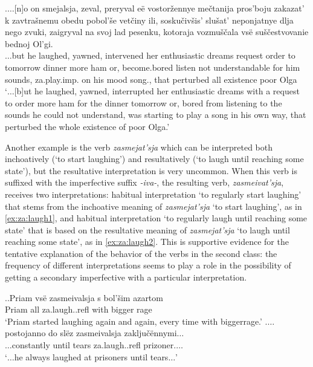\exg.\label{ex:zaigryvat}$\ldots$[n]o on smejalsja, zeval, preryval e\"{e} vostor\v{z}ennye me\v{c}tanija pros'boju zakazat' k zavtra\v{s}nemu obedu pobol'\v{s}e vet\v{c}iny ili, sosku\v{c}iv\v{s}is' slu\v{s}at' neponjatnye dlja nego zvuki, zaigryval na svoj lad pesenku, kotoraja vozmu\v{s}\v{c}ala vs\"{e} su\v{s}\v{c}estvovanie bednoj Ol'gi.\\
$\ldots$but he laughed, yawned, intervened her enthusiastic dreams request order to tomorrow dinner more ham or, {become.bored} listen {not understandable} for him sounds, za.play.imp. on his mood song., that perturbed all existence poor Olga\\
\trans `$\ldots$[b]ut he laughed, yawned, interrupted her enthusiastic dreams with a request to order more ham for the dinner tomorrow or, bored from listening to the sounds he could not understand, was starting to play a song in his own way, that perturbed the whole existence of poor Olga.'\\

Another example is the verb \textit{zasmejat'sja} which can be interpreted both inchoatively (`to start laughing') and resultatively (`to laugh until reaching some state'), but the resultative interpretation is very uncommon. When this verb is suffixed with the imperfective suffix \textit{-iva-}, the resulting verb, \textit{zasmeivat'sja}, receives two interpretations: habitual interpretation `to regularly start laughing' that stems from the inchoative meaning of \textit{zasmejat'sja} `to start laughing', as in \ref{ex:za:laugh1}, and habitual interpretation `to regularly laugh until reaching some state' that is based on the resultative meaning of \textit{zasmejat'sja} `to laugh until reaching some state', as in \ref{ex:za:laugh2}. This is supportive evidence for the tentative explanation of the behavior of the verbs in the second class: the frequency of different interpretations seems to play a role in the possibility of getting a secondary imperfective with a particular interpretation.

\ex.\label{ex:za:laugh}\ag.\label{ex:za:laugh1}Priam vs\"{e} zasmeivalsja s bol'\v{s}im azartom\\
Priam all za.laugh..refl with bigger rage\\
\trans `Priam started laughing again and again, every time with bigger\linebreak rage.'
\bg.\label{ex:za:laugh2}$\ldots$postojanno do sl\"{e}z zasmeivalsja zaklju\v{c}\"{e}nnymi$\ldots$\\
$\ldots$constantly until tears za.laugh..refl prizoner.$\ldots$\\
\trans `$\ldots$he always laughed at prisoners until tears$\ldots$'


